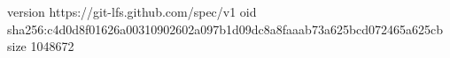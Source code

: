 version https://git-lfs.github.com/spec/v1
oid sha256:c4d0d8f01626a00310902602a097b1d09dc8a8faaab73a625bcd072465a625cb
size 1048672

